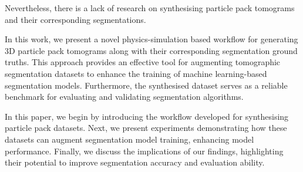 \documentclass[preprint,12pt]{elsarticle}
\begin{document}
Nevertheless, there is a lack of research on synthesising particle pack tomograms and their corresponding segmentations.
\par
In this work, we present a novel physics-simulation based workflow for generating 3D particle pack tomograms along with their corresponding segmentation ground truths. 
This approach provides an effective tool for augmenting tomographic segmentation datasets to enhance the training of machine learning-based segmentation models.
Furthermore, the synthesised dataset serves as a reliable benchmark for evaluating and validating segmentation algorithms.
\par
In this paper, we begin by introducing the workflow developed for synthesising particle pack datasets.
Next, we present experiments demonstrating how these datasets can augment segmentation model training, enhancing model performance.
Finally, we discuss the implications of our findings, highlighting their potential to improve segmentation accuracy and evaluation ability.
\end{document}
